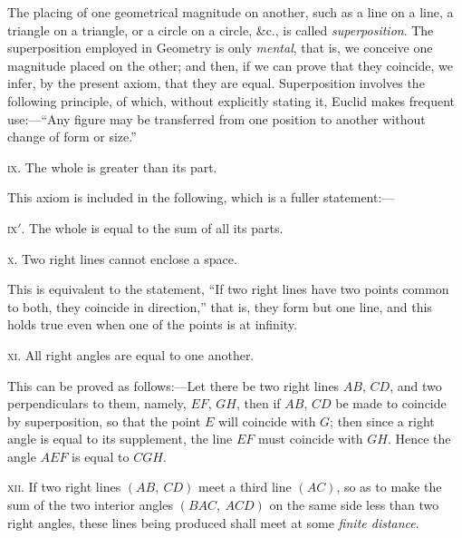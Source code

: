 \documentclass[oneside]{book}
\begin{document}
\begin{footnotesize}
The placing of one geometrical magnitude on another, such as a
line on a line, a triangle on a triangle, or a circle on a circle, \&c.,
is called \emph{superposition}. The superposition employed in Geometry
is only \emph{mental}, that is, we conceive one magnitude placed on the
other; and then, if we can prove that they coincide, we infer, by
the present axiom, that they are equal. Superposition involves the
following principle, of which, without explicitly stating it, Euclid
makes frequent use:---``Any figure may be transferred from one
position to another without change of form or size.''
\par\end{footnotesize}

\textsc{ix}. The whole is greater than its part.

\begin{footnotesize}
This axiom is included in the following, which is a fuller statement:---
\par\end{footnotesize}

\textsc{ix$'$}. The whole is equal to the sum of all its parts.

\textsc{x}. Two right lines cannot enclose a space.

\begin{footnotesize}
This is equivalent to the statement, ``If two right lines have two
points common to both, they coincide in direction,'' that is, they
form but one line, and this holds true even when one of the points
is at infinity.
\par\end{footnotesize}

\textsc{xi}. All right angles are equal to one another.

\begin{footnotesize}
This can be proved as follows:---Let there be two right lines
$AB$, $CD$, and two perpendiculars to them, namely, $EF$, $GH$, then
if $AB$, $CD$ be made to coincide by superposition, so that the point
$E$ will coincide with $G$; then since a right angle is equal to its
supplement, the line $EF$ must coincide with $GH$. Hence the
angle $AEF$ is equal to $CGH$.
\end{footnotesize}

\textsc{xii}. If two right lines $(AB,\ CD)$ meet a third line
$(AC)$, so as to make the sum
of the two interior angles
$(BAC,\ ACD)$ on the same
side less than two right angles,
these lines being produced
shall meet at some
\emph{finite distance}.
\end{document}
